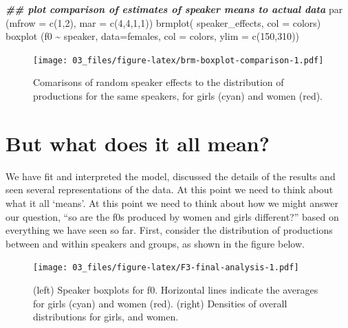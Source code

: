 \documentclass[
]{book}
\newenvironment{Shaded}{\begin{snugshade}}{\end{snugshade}}
\newcommand{\AttributeTok}[1]{\textcolor[rgb]{0.77,0.63,0.00}{#1}}
\newcommand{\DecValTok}[1]{\textcolor[rgb]{0.00,0.00,0.81}{#1}}
\newcommand{\DocumentationTok}[1]{\textcolor[rgb]{0.56,0.35,0.01}{\textbf{\textit{#1}}}}
\newcommand{\FunctionTok}[1]{\textcolor[rgb]{0.00,0.00,0.00}{#1}}
\newcommand{\NormalTok}[1]{#1}
\newcommand{\SpecialCharTok}[1]{\textcolor[rgb]{0.00,0.00,0.00}{#1}}
\begin{document}
\begin{Shaded}
\begin{Highlighting}[]
\DocumentationTok{\#\# plot comparison of estimates of speaker means to actual data}
\FunctionTok{par}\NormalTok{ (}\AttributeTok{mfrow =} \FunctionTok{c}\NormalTok{(}\DecValTok{1}\NormalTok{,}\DecValTok{2}\NormalTok{), }\AttributeTok{mar =} \FunctionTok{c}\NormalTok{(}\DecValTok{4}\NormalTok{,}\DecValTok{4}\NormalTok{,}\DecValTok{1}\NormalTok{,}\DecValTok{1}\NormalTok{))}
\FunctionTok{brmplot}\NormalTok{( speaker\_effects, }\AttributeTok{col =}\NormalTok{ colors)}
\FunctionTok{boxplot}\NormalTok{ (f0 }\SpecialCharTok{\textasciitilde{}}\NormalTok{ speaker, }\AttributeTok{data=}\NormalTok{females, }\AttributeTok{col =}\NormalTok{ colors, }\AttributeTok{ylim =} \FunctionTok{c}\NormalTok{(}\DecValTok{150}\NormalTok{,}\DecValTok{310}\NormalTok{))}
\end{Highlighting}
\end{Shaded}

\begin{figure}
\centering
\texttt{[image: 03\_files/figure-latex/brm-boxplot-comparison-1.pdf]}
\caption{\label{fig:brm-boxplot-comparison}Comarisons of random speaker effects to the distribution of productions for the same speakers, for girls (cyan) and women (red).}
\end{figure}

\hypertarget{but-what-does-it-all-mean}{%
\section{But what does it all mean?}\label{but-what-does-it-all-mean}}

We have fit and interpreted the model, discussed the details of the results and seen several representations of the data. At this point we need to think about what it all `means'. At this point we need to think about how we might answer our question, ``so are the f0s produced by women and girls different?'' based on everything we have seen so far. First, consider the distribution of productions between and within speakers and groups, as shown in the figure below.

\begin{figure}
\centering
\texttt{[image: 03\_files/figure-latex/F3-final-analysis-1.pdf]}
\caption{\label{fig:F3-final-analysis}(left) Speaker boxplots for f0. Horizontal lines indicate the averages for girls (cyan) and women (red). (right) Densities of overall distributions for girls, and women.}
\end{figure}
\end{document}

